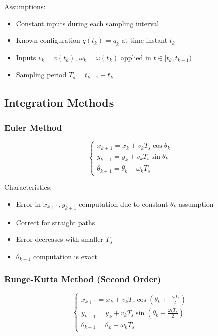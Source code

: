 \documentclass[openany]{book}
\theoremstyle{definition}
\theoremstyle{remark}
\begin{document}
Assumptions:
\begin{itemize}
   \item Constant inputs during each sampling interval
   \item Known configuration $q(t_k) = q_k$ at time instant $t_k$
   \item Inputs $v_k = v(t_k)$, $\omega_k = \omega(t_k)$ applied in $t \in [t_k, t_{k+1})$
   \item Sampling period $T_s = t_{k+1} - t_k$
\end{itemize}

\subsection{Integration Methods}

\subsubsection{Euler Method}
\begin{equation}
\begin{cases}
x_{k+1} = x_k + v_k T_s \cos \theta_k \\
y_{k+1} = y_k + v_k T_s \sin \theta_k \\
\theta_{k+1} = \theta_k + \omega_k T_s
\end{cases}
\end{equation}

Characteristics:
\begin{itemize}
   \item Error in $x_{k+1}, y_{k+1}$ computation due to constant $\theta_k$ assumption
   \item Correct for straight paths
   \item Error decreases with smaller $T_s$
   \item $\theta_{k+1}$ computation is exact
\end{itemize}

\subsubsection{Runge-Kutta Method (Second Order)}
\begin{equation}
\begin{cases}
x_{k+1} = x_k + v_k T_s \cos(\theta_k + \frac{\omega_k T_s}{2}) \\
y_{k+1} = y_k + v_k T_s \sin(\theta_k + \frac{\omega_k T_s}{2}) \\
\theta_{k+1} = \theta_k + \omega_k T_s
\end{cases}
\end{equation}
\end{document}
